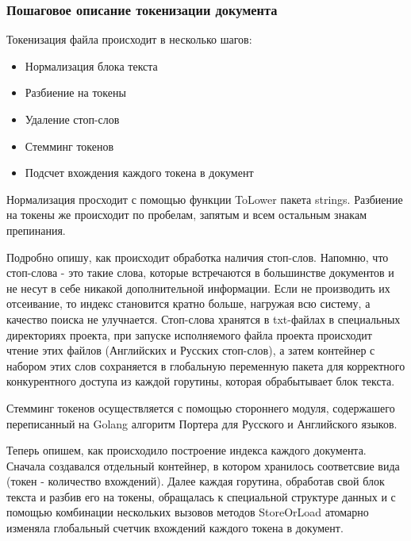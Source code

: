 \subsubsection*{Пошаговое описание токенизации документа}
Токенизация файла происходит в несколько шагов:
\begin{itemize}
    \item {Нормализация блока текста}
    \item {Разбиение на токены}
    \item {Удаление стоп-слов}
    \item {Стемминг токенов}
    \item {Подсчет вхождения каждого токена в документ}
\end{itemize}
\par \vspace{10pt}
Нормализация просходит с помощью функции ToLower пакета strings. Разбиение на токены же происходит по 
пробелам, запятым и всем остальным знакам препинания.
\par
Подробно опишу, как происходит обработка наличия стоп-слов. Напомню, что стоп-слова - это такие слова, которые 
встречаются в большинстве документов и не несут в себе никакой дополнительной информации. Если не производить 
их отсеивание, то индекс становится кратно больше, нагружая всю систему, а качество поиска не улучнается. 
Стоп-слова хранятся в txt-файлах в специальных директориях проекта, при запуске исполняемого файла проекта
происходит чтение этих файлов (Английских и Русских стоп-слов), а затем контейнер с набором этих слов сохраняется 
в глобальную переменную пакета для корректного конкурентного доступа из каждой горутины, которая обрабытывает блок текста. 
\par
Стемминг токенов осуществляется с помощью стороннего модуля, содержашего переписанный на Golang алгоритм 
Портера для Русского и Английского языков. 
\par
Теперь опишем, как происходило построение индекса каждого документа. Сначала создавался отдельный контейнер, в котором
хранилось соответсвие вида (токен - количество вхождений). Далее каждая горутина, обработав свой блок текста и разбив его на токены, 
обращалась к специальной структуре данных и с помощью комбинации нескольких вызовов методов StoreOrLoad атомарно изменяла глобальный счетчик вхождений каждого 
токена в документ.
